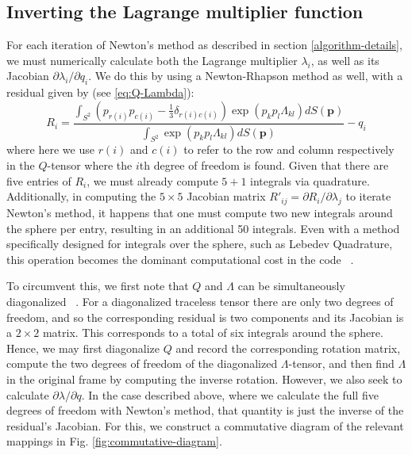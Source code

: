 \documentclass[reqno]{article}
\begin{document}
  \subsection{Inverting the Lagrange multiplier function}
  For each iteration of Newton's method as described in section
  \ref{algorithm-details}, we must numerically calculate both the Lagrange multiplier
  $\lambda_i$, as well as its Jacobian $\partial \lambda_i/ \partial q_i$.
  We do this by using a Newton-Rhapson method as well, with a residual given by (see
  \eqref{eq:Q-Lambda}):
  \begin{equation}
    R_i
    =
    \frac{\int_{S^2} (p_{r(i)} p_{c(i)} - \tfrac13 \delta_{r(i) c(i)}) \exp(p_k p_l \Lambda_{kl}) dS(\mathbf{p})}
    {\int_{S^2} \exp(p_k p_l \Lambda_{kl}) dS(\mathbf{p})} - q_i
  \end{equation}
  where here we use $r(i)$ and $c(i)$ to refer to the row and column respectively in the
  $Q$-tensor where the $i$th degree of freedom is found.
  Given that there are five entries of $R_i$, we must already compute $5 + 1$
  integrals via quadrature.
  Additionally, in computing the $5\times 5$ Jacobian matrix
  $R'_{ij} = \partial R_i / \partial \lambda_j$ to iterate Newton's method, it
  happens that one must compute two new integrals around the sphere per entry,
  resulting in an additional 50 integrals.
  Even with a method specifically designed for integrals over the sphere, such
  as Lebedev Quadrature, this operation becomes the dominant computational cost
  in the code ~\cite{burkhardt_lebedev_quadrature, LEBEDEV197610}.
  
  To circumvent this, we first note that $Q$ and $\Lambda$ can be simultaneously
  diagonalized ~\cite{schimming_numerical_2021}.
  For a diagonalized traceless tensor there are only two degrees of
  freedom, and so the corresponding residual is two components and its Jacobian
  is a $2\times 2$ matrix.
  This corresponds to a total of six integrals around the sphere.
  Hence, we may first diagonalize $Q$ and record the corresponding rotation
  matrix, compute the two degrees of freedom of the diagonalized
  $\Lambda$-tensor, and then find $\Lambda$ in the original frame by computing
  the inverse rotation.
  However, we also seek to calculate $\partial \lambda/\partial q$.
  In the case described above, where we calculate the full five degrees of
  freedom with Newton's method, that quantity is just the inverse of the
  residual's Jacobian.
  For this, we construct a commutative diagram of the relevant mappings in Fig.
  \ref{fig:commutative-diagram}.
\end{document}
